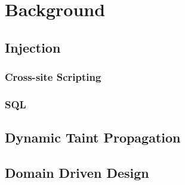 \chapter{Background}


\section{Injection}
\subsection{Cross-site Scripting}
\subsection{SQL}

\section{Dynamic Taint Propagation}

\section{Domain Driven Design}